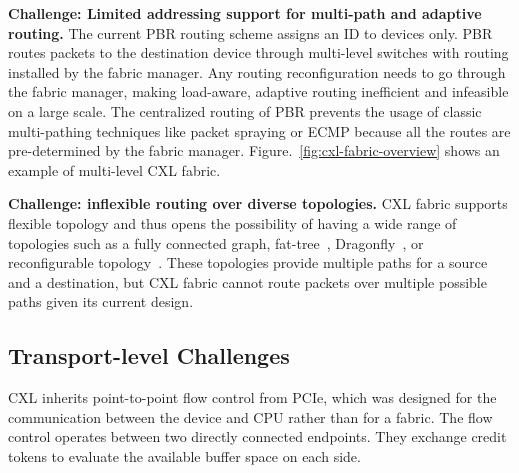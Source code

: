 \noindent \textbf{Challenge: Limited addressing support for multi-path and adaptive routing.}
%
%
The current PBR routing scheme assigns an ID to devices only. 
%
PBR routes packets to the destination device through multi-level switches with routing installed by the fabric manager. 
%
Any routing reconfiguration needs to go through the fabric manager, making load-aware, adaptive routing inefficient and infeasible on a large scale.
%
The centralized routing of PBR prevents the usage of classic multi-pathing techniques like packet spraying or ECMP because all the routes are pre-determined by the fabric manager.
%
Figure.~\ref{fig:cxl-fabric-overview} shows an example of multi-level CXL fabric.     
%
%
%

\noindent \textbf{Challenge: inflexible routing over diverse topologies.}
CXL fabric supports flexible topology and thus opens the possibility of having a wide range of topologies such as a fully connected graph, fat-tree~\cite{fat-tree:sigcomm:2008}, Dragonfly~\cite{dragonfly:isca:2008}, or reconfigurable topology~\cite{string-figure:hpca:2019}. 
%
These topologies provide multiple paths for a source and a destination, but CXL fabric cannot route packets over multiple possible paths given its current design.

\subsection{Transport-level Challenges}
\label{aurelia:sec:motivation:transport}

CXL inherits point-to-point flow control from PCIe, which was designed for the communication between the device and CPU rather than for a fabric. 
%
The flow control operates between two directly connected endpoints. 
%
They exchange credit tokens to evaluate the available buffer space on each side. 
%

